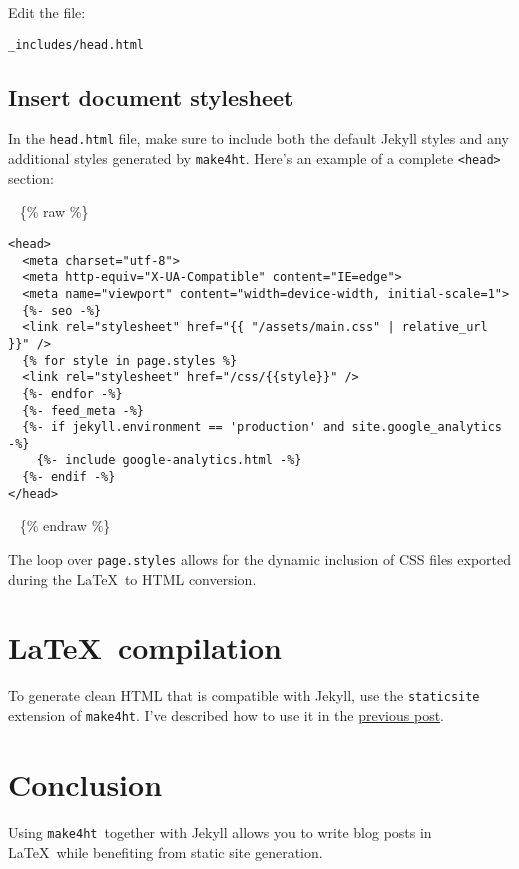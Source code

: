 \documentclass{article}
\def\makeht{\texttt{make4ht}}
\newcommand\liquidtag[1]{%
  \ifdefined\HCode\NoFonts\IgnorePar\EndP\HCode{\Hnewline}\{\% #1 \%\}\EndNoFonts\fi%
}
\begin{document}
Edit the file:

\begin{verbatim}
_includes/head.html
\end{verbatim}

\subsection{Insert document stylesheet}

In the \texttt{head.html} file, make sure to include both the default Jekyll styles and any additional styles generated by \makeht. Here's an example of a complete \texttt{<head>} section:

\liquidtag{raw}
\begin{verbatim}
<head>
  <meta charset="utf-8">
  <meta http-equiv="X-UA-Compatible" content="IE=edge">
  <meta name="viewport" content="width=device-width, initial-scale=1">
  {%- seo -%}
  <link rel="stylesheet" href="{{ "/assets/main.css" | relative_url }}" />
  {% for style in page.styles %}
  <link rel="stylesheet" href="/css/{{style}}" />
  {%- endfor -%}
  {%- feed_meta -%}
  {%- if jekyll.environment == 'production' and site.google_analytics -%}
    {%- include google-analytics.html -%}
  {%- endif -%}
</head>
\end{verbatim}
\liquidtag{endraw}

The loop over \texttt{page.styles} allows for the dynamic inclusion of CSS files exported during the \LaTeX\ to HTML conversion.

\section{\LaTeX\ compilation}

To generate clean HTML that is compatible with Jekyll, use the \texttt{staticsite} extension of \makeht. I've described how to use it in the \href{/testblog/2021/07/30/how-to-blog-with-tex4ht.html}{previous post}.

\section{Conclusion}

Using \makeht\ together with Jekyll allows you to write blog posts in \LaTeX\ while benefiting from static site generation.
\end{document}
